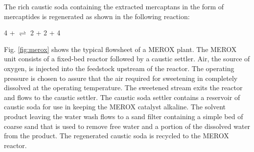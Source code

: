 The rich caustic soda containing the extracted mercaptans in the form of mercaptides is regenerated as shown in the following reaction:
\begin{center}
4 +  $\rightleftharpoons$ 2 + 2 + 4
\end{center}
Fig. \ref{fig:merox} shows the typical flowsheet of a MEROX plant. The MEROX unit consists of a fixed-bed reactor followed by a caustic settler. Air, the source of oxygen, is injected into the feedstock upstream of the reactor. The operating pressure is chosen to assure that the air required for sweetening in completely dissolved at the operating temperature. The sweetened stream exits the reactor and flows to the caustic settler. The caustic soda settler contains a reservoir of caustic soda for use in keeping the MEROX catalyst alkaline. The solvent product leaving the water wash flows to a sand filter containing a simple bed of coarse sand that is used to remove free water and a portion of the dissolved water from the product. The regenerated caustic soda is recycled to the
MEROX reactor.
